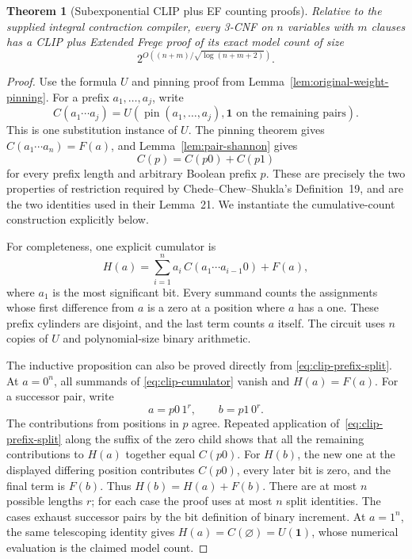 \documentclass[11pt]{article}
\newtheorem{theorem}{Theorem}[section]
\theoremstyle{definition}
\theoremstyle{remark}
\begin{document}
\begin{theorem}[Subexponential CLIP plus EF counting proofs]
\label{thm:clip-counting}
Relative to the supplied integral contraction compiler, every
3-CNF on $n$ variables with $m$ clauses has a CLIP plus Extended
Frege proof of its exact model count of size
\[
 2^{O((n+m)/\sqrt{\log(n+m+2)})}.
\]
\end{theorem}
\begin{proof}
Use the formula $U$ and pinning proof from
Lemma~\ref{lem:original-weight-pinning}. For a prefix
$a_1,\ldots,a_j$, write
\[
 C(a_1\cdots a_j)
 =U(\operatorname{pin}(a_1,\ldots,a_j),\mathbf1
       \text{ on the remaining pairs}).
\]
This is one substitution instance of $U$. The pinning theorem gives
$C(a_1\cdots a_n)=F(a)$, and
Lemma~\ref{lem:pair-shannon} gives
\[
 C(p)=C(p0)+C(p1)
 \tag{\thesection.1}\label{eq:clip-prefix-split}
\]
for every prefix length and arbitrary Boolean prefix $p$. These
are precisely the two properties of restriction required by
Chede--Chew--Shukla's Definition~19, and are the two identities used
in their Lemma~21. We instantiate the cumulative-count construction
explicitly below.

For completeness, one explicit cumulator is
\[
 H(a)=\sum_{i=1}^n a_i\,C(a_1\cdots a_{i-1}0)+F(a),
 \tag{\thesection.2}\label{eq:clip-cumulator}
\]
where $a_1$ is the most significant bit. Every summand counts the
assignments whose first difference from $a$ is a zero at a position
where $a$ has a one. These prefix cylinders are disjoint, and the
last term counts $a$ itself. The circuit uses $n$ copies of $U$
and polynomial-size binary arithmetic.

The inductive proposition can also be proved directly from
\eqref{eq:clip-prefix-split}. At $a=0^n$, all summands of
\eqref{eq:clip-cumulator} vanish and $H(a)=F(a)$.
For a successor pair, write
\[
 a=p0\,1^r,\qquad b=p1\,0^r.
\]
The contributions from positions in $p$ agree. Repeated application
of~\eqref{eq:clip-prefix-split} along the suffix of the zero child
shows that all the remaining contributions to $H(a)$ together equal
$C(p0)$. For $H(b)$, the new one at the displayed differing position
contributes $C(p0)$, every later bit is zero, and the final term is
$F(b)$. Thus $H(b)=H(a)+F(b)$. There are at most $n$ possible lengths
$r$; for each case the proof uses at most $n$ split identities.
The cases exhaust successor pairs by the bit definition of binary
increment. At $a=1^n$, the same telescoping identity gives
$H(a)=C(\varnothing)=U(\mathbf1)$, whose numerical evaluation is
the claimed model count.


\end{proof}
\end{document}
